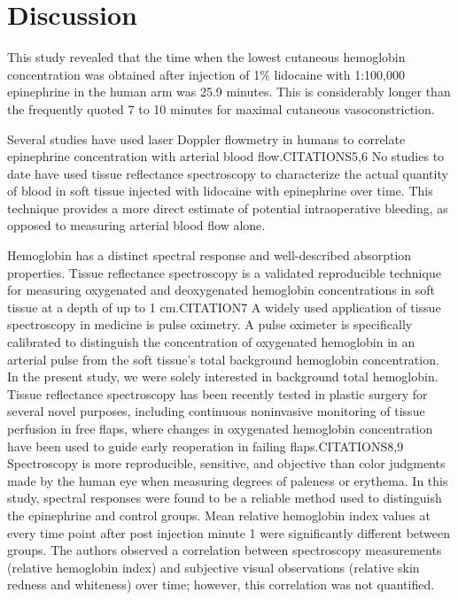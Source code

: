 \section{Discussion}
This study revealed that the time when the lowest cutaneous hemoglobin concentration was obtained after injection of 1\% lidocaine with 1:100,000 epinephrine in the human arm was 25.9 minutes. This is considerably longer than the frequently quoted 7 to 10 minutes for maximal cutaneous vasoconstriction.\cite{Larrabee1987}

Several studies have used laser Doppler flowmetry in humans to correlate epinephrine concentration with arterial blood flow.CITATIONS5,6 No studies to date have used tissue reflectance spectroscopy to characterize the actual quantity of blood in soft tissue injected with lidocaine with epinephrine over time. This technique provides a more direct estimate of potential intraoperative bleeding, as opposed to measuring arterial blood flow alone.

Hemoglobin has a distinct spectral response and well-described absorption properties. Tissue reflectance spectroscopy is a validated reproducible technique for measuring oxygenated and deoxygenated hemoglobin concentrations in soft tissue at a depth of up to 1 cm.\cite{Dawson1980}CITATION7 A widely used application of tissue spectroscopy in medicine is pulse oximetry. A pulse oximeter is specifically calibrated to distinguish the concentration of oxygenated hemoglobin in an arterial pulse from the soft tissue's total background hemoglobin concentration. In the present study, we were solely interested in background total hemoglobin. Tissue reflectance spectroscopy has been recently tested in plastic surgery for several novel purposes, including continuous noninvasive monitoring of tissue perfusion in free flaps, where changes in oxygenated hemoglobin concentration have been used to guide early reoperation in failing flaps.CITATIONS8,9 Spectroscopy is more reproducible, sensitive, and objective than color judgments made by the human eye when measuring degrees of paleness or erythema. In this study, spectral responses were found to be a reliable method used to distinguish the epinephrine and control groups. Mean relative hemoglobin index values at every time point after post injection minute 1 were significantly different between groups. The authors observed a correlation between spectroscopy measurements (relative hemoglobin index) and subjective visual observations (relative skin redness and whiteness) over time; however, this correlation was not quantified.

